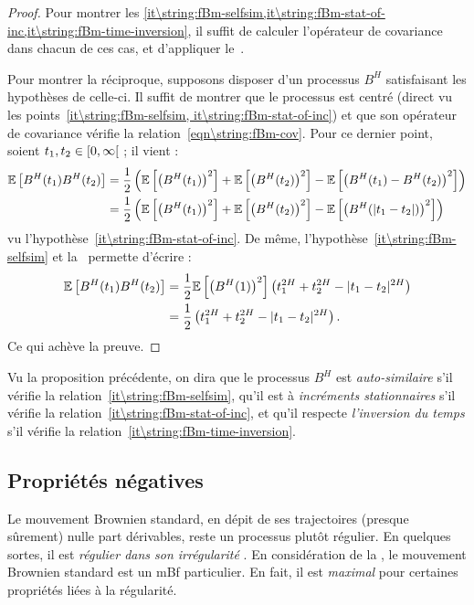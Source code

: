 \begin{proof}
  Pour montrer les
  \cref{it\string:fBm-selfsim,it\string:fBm-stat-of-inc,it\string:fBm-time-inversion},
  il suffit de calculer l'opérateur de covariance dans chacun de ces
  cas, et d'appliquer le~.

  Pour montrer la réciproque, supposons disposer d'un processus $B^H$
  satisfaisant les hypothèses de celle-ci. Il suffit de montrer que le
  processus est centré (direct vu les
  points~\cref{it\string:fBm-selfsim, it\string:fBm-stat-of-inc}) et
  que son opérateur de covariance vérifie la
  relation~\cref{eqn\string:fBm-cov}. Pour ce dernier point, soient
  $t_1,t_2\in\left[0,\infty\right[$ ; il vient :
  \begin{align*}
    \mathbb{E}\left[B^H(t_1)B^H(t_2)\right] &= \frac{1}{2}\left(\mathbb{E}\left[\left(B^H(t_1)\right)^2\right]+\mathbb{E}\left[\left(B^H(t_2)\right)^2\right]-\mathbb{E}\left[\left(B^H(t_1)-B^H(t_2)\right)^2\right]\right)\\
                           &= \frac{1}{2}\left(\mathbb{E}\left[\left(B^H(t_1)\right)^2\right]+\mathbb{E}\left[\left(B^H(t_2)\right)^2\right]-\mathbb{E}\left[\left(B^H(|t_1-t_2|)\right)^2\right]\right)
  \end{align*}
  vu l'hypothèse~\cref{it\string:fBm-stat-of-inc}. De même,
  l'hypothèse~\cref{it\string:fBm-selfsim} et
  la~ permette d'écrire :
  \begin{align*}
    \mathbb{E}\left[B^H(t_1)B^H(t_2)\right] &= \frac{1}{2}\mathbb{E}\left[\left(B^H(1)\right)^2\right]\left(t_1^{2H}+t_2^{2H}-|t_1-t_2|^{2H}\right)\\
                           &= \frac{1}{2}\left(t_1^{2H}+t_2^{2H}-|t_1-t_2|^{2H}\right).
  \end{align*}
  Ce qui achève la preuve.
\end{proof}

Vu la proposition précédente, on dira que le processus $B^H$ est
\emph{auto-similaire} s'il vérifie la
relation~\cref{it\string:fBm-selfsim}, qu'il est à \emph{incréments
  stationnaires} s'il vérifie la
relation~\cref{it\string:fBm-stat-of-inc}, et qu'il respecte
\emph{l'inversion du temps} s'il vérifie la
relation~\cref{it\string:fBm-time-inversion}.

\subsection{Propriétés négatives}
\label{subsec\string:fBm-absence-of-props}

Le mouvement Brownien standard, en dépit de ses trajectoires (presque
sûrement) nulle part dérivables, reste un processus plutôt
régulier. En quelques sortes, il est \emph{\og régulier dans son
  irrégularité \fg{}}. En considération de la
, le mouvement Brownien standard est un mBf
particulier. En fait, il est \emph{maximal} pour certaines propriétés
liées à la régularité.


